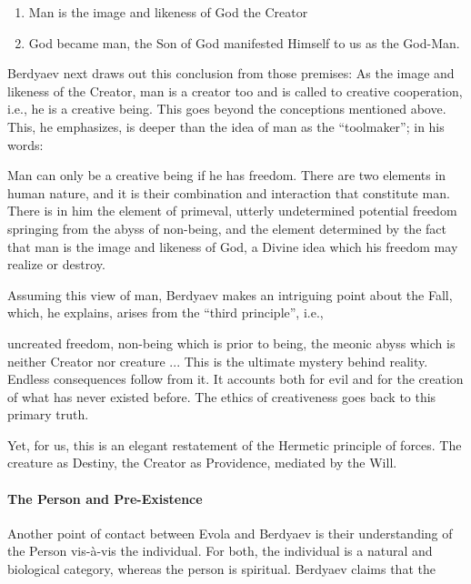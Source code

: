 \begin{enumerate}


\item Man is the image and likeness of God the Creator

\item God became man, the Son of God manifested Himself to us as the God-Man.
\end{enumerate}


Berdyaev next draws out this conclusion from those premises: As the image and likeness of the Creator, man is a creator too and is called to creative cooperation, i.e., he is a creative being. This goes beyond the conceptions mentioned above. This, he emphasizes, is deeper than the idea of man as the ``toolmaker''; in his words:

\begin{quotex}
Man can only be a creative being if he has freedom. There are two elements in human nature, and it is their combination and interaction that constitute man. There is in him the element of primeval, utterly undetermined potential freedom springing from the abyss of non-being, and the element determined by the fact that man is the image and likeness of God, a Divine idea which his freedom may realize or destroy.
\end{quotex}


Assuming this view of man, Berdyaev makes an intriguing point about the Fall, which, he explains, arises from the ``third principle'', i.e.,

\begin{quotex}
uncreated freedom, non-being which is prior to being, the meonic abyss which is neither Creator nor creature ... This is the ultimate mystery behind reality. Endless consequences follow from it. It accounts both for evil and for the creation of what has never existed before. The ethics of creativeness goes back to this primary truth.
\end{quotex}


Yet, for us, this is an elegant restatement of the Hermetic principle of forces. The creature as Destiny, the Creator as Providence, mediated by the Will.

\paragraph{The Person and Pre-Existence}


Another point of contact between Evola and Berdyaev is their understanding of the Person vis-à-vis the individual. For both, the individual is a natural and biological category, whereas the person is spiritual. Berdyaev claims that the

